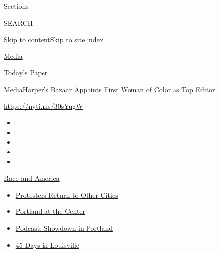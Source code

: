 Sections

SEARCH

\protect\hyperlink{site-content}{Skip to
content}\protect\hyperlink{site-index}{Skip to site index}

\href{https://www.nytimes3xbfgragh.onion/section/business/media}{Media}

\href{https://myaccount.nytimes3xbfgragh.onion/auth/login?response_type=cookie\&client_id=vi}{}

\href{https://www.nytimes3xbfgragh.onion/section/todayspaper}{Today's
Paper}

\href{/section/business/media}{Media}\textbar{}Harper's Bazaar Appoints
First Woman of Color as Top Editor

\url{https://nyti.ms/30sYugW}

\begin{itemize}
\item
\item
\item
\item
\item
\end{itemize}

\href{https://www.nytimes3xbfgragh.onion/news-event/george-floyd-protests-minneapolis-new-york-los-angeles?action=click\&pgtype=Article\&state=default\&region=TOP_BANNER\&context=storylines_menu}{Race
and America}

\begin{itemize}
\tightlist
\item
  \href{https://www.nytimes3xbfgragh.onion/2020/07/26/us/protests-portland-seattle-trump.html?action=click\&pgtype=Article\&state=default\&region=TOP_BANNER\&context=storylines_menu}{Protesters
  Return to Other Cities}
\item
  \href{https://www.nytimes3xbfgragh.onion/2020/07/24/us/portland-oregon-protests-white-race.html?action=click\&pgtype=Article\&state=default\&region=TOP_BANNER\&context=storylines_menu}{Portland
  at the Center}
\item
  \href{https://www.nytimes3xbfgragh.onion/2020/07/23/podcasts/the-daily/portland-protests.html?action=click\&pgtype=Article\&state=default\&region=TOP_BANNER\&context=storylines_menu}{Podcast:
  Showdown in Portland}
\item
  \href{https://www.nytimes3xbfgragh.onion/interactive/2020/07/16/us/black-lives-matter-protests-louisville-breonna-taylor.html?action=click\&pgtype=Article\&state=default\&region=TOP_BANNER\&context=storylines_menu}{45
  Days in Louisville}
\end{itemize}

